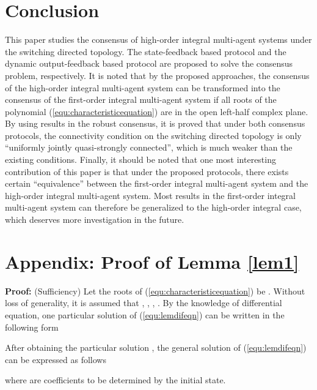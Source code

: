 \documentclass[12pt,draftcls,onecolumn]{IEEEtran}
\begin{document}
\section{Conclusion}\label{Conclusion}
This paper studies the consensus of high-order integral multi-agent systems under the switching directed topology. The state-feedback based protocol and the dynamic output-feedback based protocol are proposed to solve the consensus problem, respectively. It is noted that by the proposed approaches, the consensus of the high-order integral multi-agent system can be transformed into the consensus of the first-order integral multi-agent system if all roots of the polynomial (\ref{equ:characteristicequation}) are in the open left-half complex plane. By using results in the robust consensus, it is proved that under both consensus protocols, the connectivity condition on the switching directed topology is only ``uniformly jointly quasi-strongly connected'', which is much weaker than the existing conditions. Finally, it should be noted that one most interesting contribution of this paper is that under the proposed protocols, there exists certain ``equivalence'' between the first-order integral multi-agent system and the high-order integral multi-agent system. Most results in the first-order integral multi-agent system can therefore be generalized to the high-order integral case, which deserves more investigation in the future.





\section*{Appendix: Proof of Lemma \ref{lem1}}
\textbf{Proof:} (Sufficiency) Let the roots of (\ref{equ:characteristicequation}) be . Without loss of generality, it is assumed that , , ,  . By the knowledge of differential equation, one particular solution of (\ref{equ:lemdifeqn}) can be written in the following form


After obtaining the particular solution , the general solution of (\ref{equ:lemdifeqn}) can be expressed as follows

where  are coefficients to be determined by the initial state.
\end{document}
